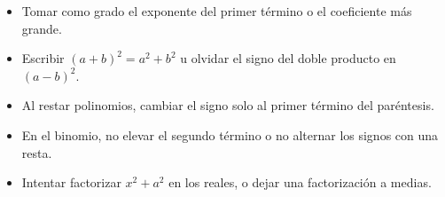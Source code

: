 \documentclass[11pt,a4paper]{article}
\begin{document}
\begin{ojo}
\begin{itemize}
\item Tomar como grado el exponente del primer término o el coeficiente más grande.
\item Escribir $(a+b)^2=a^2+b^2$ u olvidar el signo del doble producto en $(a-b)^2$.
\item Al restar polinomios, cambiar el signo solo al primer término del paréntesis.
\item En el binomio, no elevar el segundo término o no alternar los signos con una resta.
\item Intentar factorizar $x^2+a^2$ en los reales, o dejar una factorización a medias.
\end{itemize}
\end{ojo}
\end{document}

